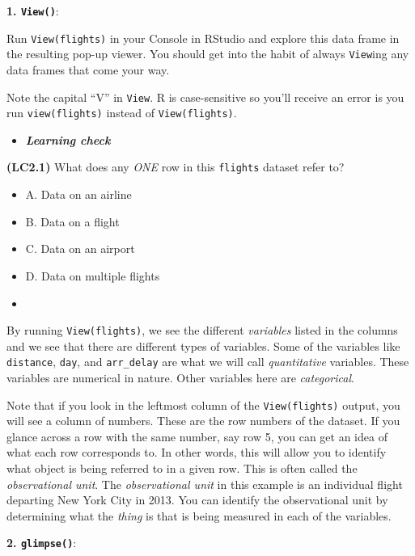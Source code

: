 \documentclass[12pt,]{krantz}
\providecommand{\tightlist}{%
  \setlength{\itemsep}{0pt}\setlength{\parskip}{0pt}}
\newenvironment{rmdblock}[1]
  {\begin{shaded*}
  \begin{itemize}
  \renewcommand{\labelitemi}{
    \raisebox{-.7\height}[0pt][0pt]{
    }
  }
  \item
  }
  {
  \end{itemize}
  \end{shaded*}
  }
\newenvironment{learncheck}
  {\begin{rmdblock}{warning}}
  {\end{rmdblock}}
\theoremstyle{definition}
\theoremstyle{definition}
\theoremstyle{definition}
\theoremstyle{remark}
\begin{document}
\textbf{1. \texttt{View()}}:

Run \texttt{View(flights)} in your Console in RStudio and explore this
data frame in the resulting pop-up viewer. You should get into the habit
of always \texttt{View}ing any data frames that come your way.

Note the capital ``V'' in \texttt{View}. R is case-sensitive so you'll
receive an error is you run \texttt{view(flights)} instead of
\texttt{View(flights)}.

\begin{learncheck}
\textbf{\emph{Learning check}}
\end{learncheck}

\textbf{(LC2.1)} What does any \emph{ONE} row in this \texttt{flights}
dataset refer to?

\begin{itemize}
\tightlist
\item
  A. Data on an airline
\item
  B. Data on a flight
\item
  C. Data on an airport
\item
  D. Data on multiple flights
\end{itemize}

\begin{learncheck}

\end{learncheck}

By running \texttt{View(flights)}, we see the different \emph{variables}
listed in the columns and we see that there are different types of
variables. Some of the variables like \texttt{distance}, \texttt{day},
and \texttt{arr\_delay} are what we will call \emph{quantitative}
variables. These variables are numerical in nature. Other variables here
are \emph{categorical}.

Note that if you look in the leftmost column of the
\texttt{View(flights)} output, you will see a column of numbers. These
are the row numbers of the dataset. If you glance across a row with the
same number, say row 5, you can get an idea of what each row corresponds
to. In other words, this will allow you to identify what object is being
referred to in a given row. This is often called the \emph{observational
unit}. The \emph{observational unit} in this example is an individual
flight departing New York City in 2013. You can identify the
observational unit by determining what the \emph{thing} is that is being
measured in each of the variables.

\textbf{2. \texttt{glimpse()}}:
\end{document}

